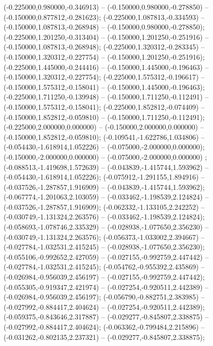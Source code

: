  (-0.225000,0.980000,-0.346913) -- (-0.150000,0.980000,-0.278850) -- (-0.150000,0.877812,-0.281623);
 (-0.225000,1.087813,-0.334593) -- (-0.150000,1.087813,-0.268948) -- (-0.150000,0.980000,-0.278850);
 (-0.225000,1.201250,-0.313404) -- (-0.150000,1.201250,-0.251916) -- (-0.150000,1.087813,-0.268948);
 (-0.225000,1.320312,-0.283345) -- (-0.150000,1.320312,-0.227754) -- (-0.150000,1.201250,-0.251916);
 (-0.225000,1.445000,-0.244416) -- (-0.150000,1.445000,-0.196463) -- (-0.150000,1.320312,-0.227754);
 (-0.225000,1.575312,-0.196617) -- (-0.150000,1.575312,-0.158041) -- (-0.150000,1.445000,-0.196463);
 (-0.225000,1.711250,-0.139948) -- (-0.150000,1.711250,-0.112491) -- (-0.150000,1.575312,-0.158041);
 (-0.225000,1.852812,-0.074409) -- (-0.150000,1.852812,-0.059810) -- (-0.150000,1.711250,-0.112491);
 (-0.225000,2.000000,0.000000) -- (-0.150000,2.000000,0.000000) -- (-0.150000,1.852812,-0.059810);
 (-0.109541,-1.622786,1.034806) -- (-0.054430,-1.618914,1.052226) -- (-0.075000,-2.000000,0.000000);
 (-0.150000,-2.000000,0.000000) -- (-0.075000,-2.000000,0.000000) ;
 (-0.088513,-1.419698,1.572639) -- (-0.043839,-1.415744,1.593962) -- (-0.054430,-1.618914,1.052226);
 (-0.075912,-1.291155,1.894916) -- (-0.037526,-1.287857,1.916909) -- (-0.043839,-1.415744,1.593962);
 (-0.067774,-1.201063,2.103059) -- (-0.033462,-1.198539,2.124824) -- (-0.037526,-1.287857,1.916909);
 (-0.062332,-1.133105,2.242252) -- (-0.030749,-1.131324,2.263576) -- (-0.033462,-1.198539,2.124824);
 (-0.058693,-1.078746,2.335329) -- (-0.028938,-1.077650,2.356230) -- (-0.030749,-1.131324,2.263576);
 (-0.056373,-1.033002,2.394667) -- (-0.027784,-1.032531,2.415245) -- (-0.028938,-1.077650,2.356230);
 (-0.055106,-0.992652,2.427059) -- (-0.027155,-0.992759,2.447442) -- (-0.027784,-1.032531,2.415245);
 (-0.054762,-0.955392,2.435869) -- (-0.026984,-0.956039,2.456197) -- (-0.027155,-0.992759,2.447442);
 (-0.055305,-0.919347,2.421974) -- (-0.027254,-0.920511,2.442389) -- (-0.026984,-0.956039,2.456197);
 (-0.056790,-0.882751,2.383985) -- (-0.027992,-0.884417,2.404624) -- (-0.027254,-0.920511,2.442389);
 (-0.059375,-0.843646,2.317887) -- (-0.029277,-0.845807,2.338875) -- (-0.027992,-0.884417,2.404624);
 (-0.063362,-0.799484,2.215896) -- (-0.031262,-0.802135,2.237321) -- (-0.029277,-0.845807,2.338875);
